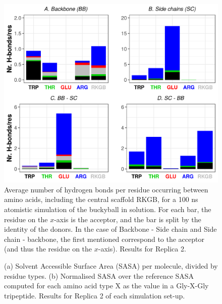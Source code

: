 \begin{figure}[t]
\centering
\includegraphics[width=0.85\linewidth]{3results_capsule/pics/R2_Hb_all.png} 
\caption[Replica 2: Hydrogen bonds in the buckyball molecule]{Average number of hydrogen bonds per residue occurring between amino acids, including the central scaffold RKGB, for a 100 ns atomistic simulation of the buckyball in solution. For each bar, the residue on the $x$-axis is the acceptor, and the bar is split by the identity of the donors. In the case of Backbone - Side chain and Side chain - backbone, the first mentioned correspond to the acceptor (and thus the residue on the $x$-axis). Results for Replica 2.}
\label{fig:BTI_hbonds2}
\end{figure}

\begin{figure}[t]
\centering
{} 
\caption[Replica 2: SASA per residue of a buckyball in solution]{(a) Solvent Accessible Surface Area (SASA) per molecule, divided by residue types. (b) Normalised SASA over the reference SASA computed for each amino acid type X as the value in a Gly-X-Gly tripeptide. Results for Replica 2 of each simulation set-up.}
\label{fig:BTI_sasa_exposed2}
\end{figure}

